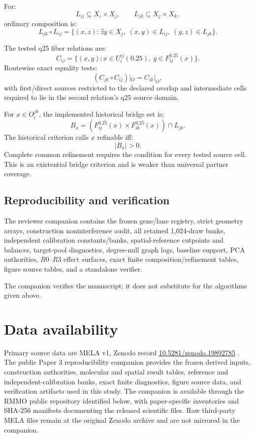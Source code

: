 \documentclass[11pt]{article}
\begin{document}
For:
\[
L_{ij}\subseteq X_i\times X_j,
\qquad
L_{jk}\subseteq X_j\times X_k,
\]
ordinary composition is:
\[
L_{jk}\circ L_{ij}
=
\{
(x,z):
\exists y\in X_j,\
(x,y)\in L_{ij},\
(y,z)\in L_{jk}
\}.
\]

The tested q25 fiber relations are:
\[
C_{ij}
=
\{
(x,y):
x\in U_i^{ij}(0.25),\
y\in F_{ij}^{0.25}(x)
\}.
\]
Routewise exact equality tests:
\[
(C_{jk}\circ C_{ij})|_O
=
C_{ik}|_O,
\]
with first/direct sources restricted to the declared overlap and intermediate cells required to lie in the second relation's q25 source domain.

For \(x\in O_i^{jk}\), the implemented historical bridge set is:
\[
B_x
=
(F_{ij}^{0.25}(x)\times F_{ik}^{0.25}(x))
\cap L_{jk}.
\]
The historical criterion calls \(x\) refinable iff:
\[
|B_x|>0.
\]
Complete common refinement requires the condition for every tested source cell. This is an existential bridge criterion and is weaker than universal partner coverage.

\subsection{Reproducibility and verification}

The reviewer companion contains the frozen gene/lane registry, strict geometry arrays, construction noninterference audit, all retained 1,024-draw banks, independent calibration constants/banks, spatial-reference cutpoints and balances, target-pool diagnostics, degree-null graph logs, baseline support, PCA authorities, \(R0\)--\(R3\) effect surfaces, exact finite composition/refinement tables, figure source tables, and a standalone verifier.

The companion verifies the manuscript; it does not substitute for the algorithms given above.

\FloatBarrier
\section{Data availability}

Primary source data are MELA v1, Zenodo record \href{https://doi.org/10.5281/zenodo.19892785}{10.5281/zenodo.19892785} \cite{Colgan2026}. The public Paper 3 reproducibility companion provides the frozen derived inputs, construction authorities, molecular and spatial result tables, reference and independent-calibration banks, exact finite diagnostics, figure source data, and verification artifacts used in this study. The companion is available through the RMMO public repository identified below, with paper-specific inventories and SHA-256 manifests documenting the released scientific files. Raw third-party MELA files remain at the original Zenodo archive and are not mirrored in the companion.
\end{document}
